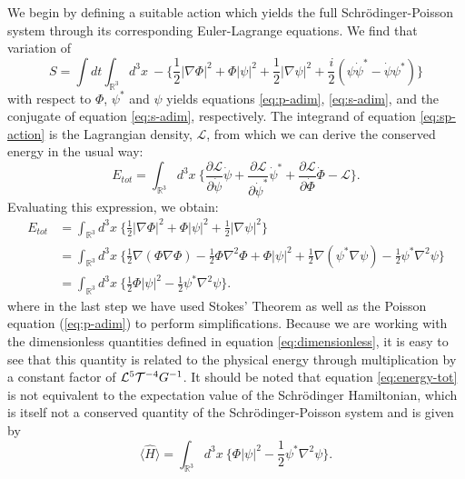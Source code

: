 \documentclass[a4paper,11pt]{article}
\begin{document}
We begin by defining a suitable action which yields the full Schr{\"o}dinger-Poisson system through its corresponding Euler-Lagrange equations. We find that variation of
\begin{equation}\label{eq:sp-action}
    S=\int dt\int_{\mathbb{R}^3} d^3x \  -\bigg\{\frac{1}{2}\vert\nabla\Phi\vert^2+\Phi\vert\psi\vert^2+\frac{1}{2}\vert\nabla\psi\vert^2+\frac{i}{2}(\psi\Dot{\psi}^*-\Dot{\psi}\psi^*)\bigg\}
\end{equation}
with respect to $\Phi$, $\psi^*$ and $\psi$ yields equations \ref{eq:p-adim}, \ref{eq:s-adim}, and the conjugate of equation \ref{eq:s-adim}, respectively. The integrand of equation \ref{eq:sp-action} is the Lagrangian density, $\mathcal{L}$, from which we can derive the conserved energy in the usual way:
\begin{equation}
    E_{tot}=\int_{\mathbb{R}^3}d^3x \ \bigg\{\frac{\partial \mathcal{L}}{\partial \Dot{\psi}}\Dot{\psi}+\frac{\partial \mathcal{L}}{\partial \Dot{\psi}^*}\Dot{\psi}^*+\frac{\partial \mathcal{L}}{\partial \Dot{\Phi}}\Dot{\Phi}-\mathcal{L}\bigg\}.
\end{equation}
Evaluating this expression, we obtain:
\begin{align}
    E_{tot}&=\int_{\mathbb{R}^3}d^3x \ \bigg\{\frac{1}{2}\vert\nabla\Phi\vert^2+\Phi\vert\psi\vert^2+\frac{1}{2}\vert\nabla\psi\vert^2\bigg\}\\
    &=\int_{\mathbb{R}^3}d^3x \ \bigg\{\frac{1}{2}\nabla(\Phi\nabla\Phi)-\frac{1}{2}\Phi\nabla^2\Phi+\Phi\vert\psi\vert^2+\frac{1}{2}\nabla(\psi^*\nabla\psi)-\frac{1}{2}\psi^*\nabla^2\psi\bigg\}\\
    &=\int_{\mathbb{R}^3}d^3x \ \bigg\{\frac{1}{2}\Phi\vert\psi\vert^2-\frac{1}{2}\psi^*\nabla^2\psi\bigg\}.\label{eq:energy-tot}
\end{align}
where in the last step we have used Stokes' Theorem as well as the Poisson equation (\ref{eq:p-adim}) to perform simplifications. Because we are working with the dimensionless quantities defined in equation \ref{eq:dimensionless}, it is easy to see that this quantity is related to the physical energy through multiplication by a constant factor of $\CMcal{L}^5\CMcal{T}^{-4}G^{-1}$. It should be noted that equation \ref{eq:energy-tot} is not equivalent to the expectation value of the Schr{\"o}dinger Hamiltonian, which is itself not a conserved quantity of the Schr{\"o}dinger-Poisson system and is given by
\begin{equation}
    \langle\hat{H}\rangle=\int_{\mathbb{R}^3}d^3x \ \bigg\{\Phi\vert\psi\vert^2-\frac{1}{2}\psi^*\nabla^2\psi\bigg\}.
\end{equation}
\end{document}

